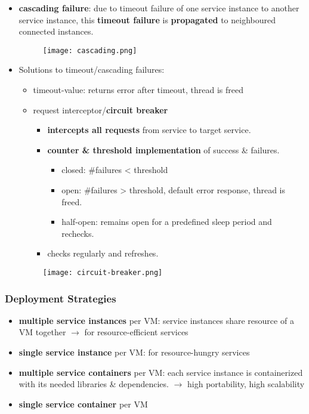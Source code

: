 \begin{itemize}
	\item \textbf{cascading failure}: due to timeout failure of one service instance to another service instance, this \textbf{timeout failure} is \textbf{propagated} to neighboured connected instances.
	\begin{figure}[H]
		\centering
		\texttt{[image: cascading.png]}
	\end{figure}
	\item Solutions to timeout/cascading failures: 
	\begin{itemize}
		\item timeout-value: returns error after timeout, thread is freed
		\item request interceptor/\textbf{circuit breaker}
		\begin{itemize}
			\item \textbf{intercepts all requests} from service to target service.
			\item \textbf{counter \& threshold implementation} of success \& failures. 
			\begin{itemize}
				\item closed: \#failures < threshold
				\item open: \#failures > threshold, default error response, thread is freed.
				\item half-open: remains open for a predefined sleep period and rechecks. 
			\end{itemize}
			\item checks regularly and refreshes.
		\end{itemize}
	\end{itemize}
	\begin{figure}[H]
		\centering
		\texttt{[image: circuit-breaker.png]}
	\end{figure}
	
\end{itemize}

\subsubsection{Deployment Strategies}
\begin{itemize}
	\item \textbf{multiple service instances} per VM: service instances share resource of a VM together $\rightarrow$ for resource-efficient services
	\item \textbf{single service instance} per VM: for resource-hungry services
	\item \textbf{multiple service containers} per VM: each service instance is containerized with its needed libraries \& dependencies. $\rightarrow$ high portability, high scalability
	\item \textbf{single service container} per VM
\end{itemize}

